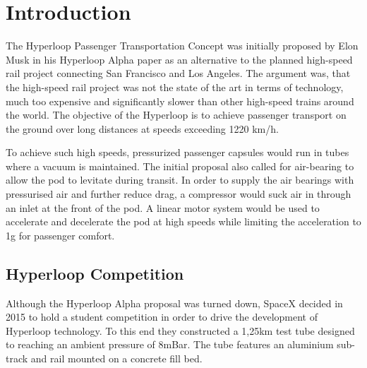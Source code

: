 
\chapter{Introduction}
The Hyperloop Passenger Transportation Concept was initially proposed by Elon Musk in his Hyperloop Alpha paper\cite{HyperloopAlpha} as an alternative to the planned high-speed rail project connecting San Francisco and Los Angeles. The argument was, that the high-speed rail project was not the state of the art in terms of technology, much too expensive and significantly slower than other high-speed trains around the world. The objective of the Hyperloop is to achieve passenger transport on the ground over long distances at speeds exceeding 1220 km/h.

To achieve such high speeds, pressurized passenger capsules would run in tubes where a vacuum is maintained. The initial proposal also called for air-bearing to allow the pod to levitate during transit. In order to supply the air bearings with pressurised air and further reduce drag, a compressor would suck air in through an inlet at the front of the pod. A linear motor system would be used to accelerate and decelerate the pod at high speeds while limiting the acceleration to 1g for passenger comfort.

\section{Hyperloop Competition}

Although the Hyperloop Alpha proposal was turned down, SpaceX decided in 2015 to hold a student competition\cite{HyperloopCompetiton} in order to drive the development of Hyperloop technology. To this end they constructed a 1,25km test tube designed to reaching an ambient pressure of 8mBar. The tube features an aluminium sub-track and rail mounted on a concrete fill bed.

